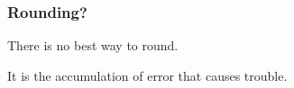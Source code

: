 \begin{frame}

\frametitle{Rounding?}

\vspace{\fill}

\begin{center}

There is no best way to round.

\end{center}

\vspace{\fill}

\begin{center}

It is the accumulation of error that causes trouble.

\end{center}

\vspace{\fill}

\end{frame}



